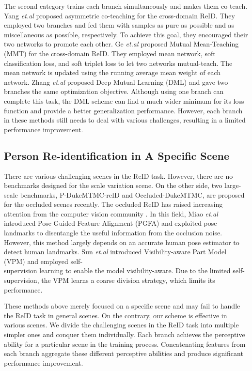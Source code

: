 \documentclass[a4paper]{cas-dc}
\begin{document}
The second category trains each branch simultaneously and makes them co-teach. Yang \textit{et.al} \cite{RN428} proposed asymmetric co-teaching for the cross-domain ReID. They employed two branches and fed them with samples as pure as possible and as miscellaneous as possible, respectively. To achieve this goal, they encouraged their two networks to promote each other. Ge \textit{et.al} \cite{RN339} proposed Mutual Mean-Teaching (MMT) for the cross-domain ReID. They employed mean network, soft classification loss, and soft triplet loss to let two networks mutual-teach. The mean network is updated using the running average mean weight of each network.  Zhang \textit{et.al} \cite{RN187} proposed Deep Mutual Learning (DML) and gave two branches the same optimization objective. Although using one branch can complete this task, the DML scheme can find a much wider minimum for its loss function and provide a better generalization performance. However, each branch in these methods still needs to deal with various challenges, resulting in a limited performance improvement.

\subsection{Person Re-identification in A Specific Scene}
There are various challenging scenes in the ReID task. However, there are no benchmarks designed for the scale variation scene. On the other side, two large-scale benchmarks, P-DukeMTMC-reID and Occluded-DukeMTMC, are proposed for the occluded scenes recently. The occluded ReID has raised increasing attention from the computer vision community \cite{RN139} \cite{RN349} \cite{RN291} \cite{RN229} \cite{RN477} \cite{RN472}. In this field, Miao \textit{et.al} \cite{RN291} introduced Pose-Guided Feature Alignment (PGFA) and exploited pose landmarks to disentangle the useful information from the occlusion noise. However, this method largely depends on an accurate human pose estimator to detect human landmarks. Sun \textit{et.al} \cite{RN229} introduced Visibility-aware Part Model (VPM) and employed self-\\supervision learning to enable the model visibility-aware. Due to the limited self-supervision, the VPM learns a coarse division strategy, which limits its performance. 

These methods above merely focused on a specific scene and may fail to handle the ReID task in general scenes. On the contrary, our scheme is effective in various scenes. We divide the challenging scenes in the ReID task into multiple simpler ones and conquer them individually. Each branch achieves the perceptive ability for a particular scene in the training process. Concatenating features from each branch aggregate these different perceptive abilities and produce significant performance improvement.
\end{document}
